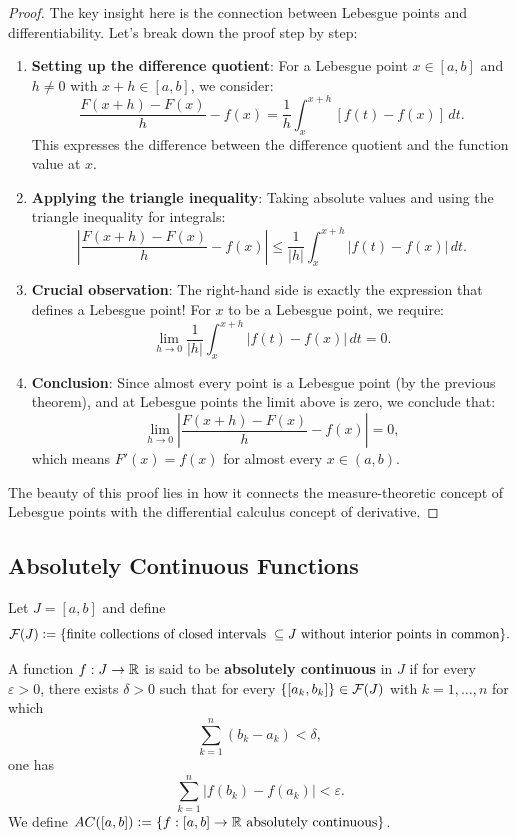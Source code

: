 \begin{proof}
The key insight here is the connection between Lebesgue points and differentiability. Let's break down the proof step by step:

\begin{enumerate}
\item \textbf{Setting up the difference quotient}: For a Lebesgue point $x \in [a,b]$ and $h \neq 0$ with $x+h \in [a,b]$, we consider:
\[
\frac{F(x+h) - F(x)}{h} - f(x) = \frac{1}{h} \int_x^{x+h} [f(t) - f(x)] \, dt.
\]
This expresses the difference between the difference quotient and the function value at $x$.

\item \textbf{Applying the triangle inequality}: Taking absolute values and using the triangle inequality for integrals:
\[
\left| \frac{F(x+h) - F(x)}{h} - f(x) \right| \leq \frac{1}{|h|} \int_x^{x+h} |f(t) - f(x)| \, dt.
\]

\item \textbf{Crucial observation}: The right-hand side is exactly the expression that defines a Lebesgue point! For $x$ to be a Lebesgue point, we require:
\[
\lim_{h \to 0} \frac{1}{|h|} \int_x^{x+h} |f(t) - f(x)| \, dt = 0.
\]

\item \textbf{Conclusion}: Since almost every point is a Lebesgue point (by the previous theorem), and at Lebesgue points the limit above is zero, we conclude that:
\[
\lim_{h \to 0} \left| \frac{F(x+h) - F(x)}{h} - f(x) \right| = 0,
\]
which means $F'(x) = f(x)$ for almost every $x \in (a,b)$.
\end{enumerate}

The beauty of this proof lies in how it connects the measure-theoretic concept of Lebesgue points with the differential calculus concept of derivative.
\end{proof}

\clearpage
\subsection{Absolutely Continuous Functions}

Let $J = [a,b]$ and define
\[
\mathcal{F}(J) \mathrel{\mathop:}= \{\text{finite collections of closed intervals } \subseteq J \text{ without interior points in common}\}.
\]

\begin{definition}
A function $f: J \to \mathbb{R}$ is said to be \textbf{absolutely continuous} in $J$ if for every $\varepsilon > 0$, there exists $\delta > 0$ such that for every $\{[a_k, b_k]\} \in \mathcal{F}(J)$ with $k = 1, \dots, n$ for which
\[
\sum_{k=1}^n (b_k - a_k) < \delta,
\]
one has
\[
\sum_{k=1}^n |f(b_k) - f(a_k)| < \varepsilon.
\]
We define $AC([a,b]) \mathrel{\mathop:}= \{ f: [a,b] \to \mathbb{R} \text{ absolutely continuous} \}$.
\end{definition}

